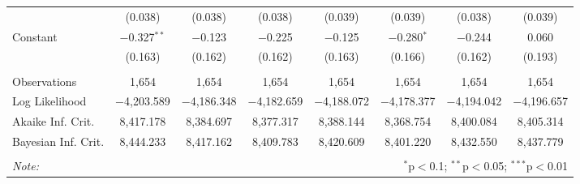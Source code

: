 \begin{sidewaystable}[!htbp]
\begin{tabular}{@{\extracolsep{5pt}}lccccccc}
  & (0.038) & (0.038) & (0.038) & (0.039) & (0.039) & (0.038) & (0.039) \\ 
  Constant & $-$0.327$^{**}$ & $-$0.123 & $-$0.225 & $-$0.125 & $-$0.280$^{*}$ & $-$0.244 & 0.060 \\ 
  & (0.163) & (0.162) & (0.162) & (0.163) & (0.166) & (0.162) & (0.193) \\ 
 \hline \\[-1.8ex] 
Observations & 1,654 & 1,654 & 1,654 & 1,654 & 1,654 & 1,654 & 1,654 \\ 
Log Likelihood & $-$4,203.589 & $-$4,186.348 & $-$4,182.659 & $-$4,188.072 & $-$4,178.377 & $-$4,194.042 & $-$4,196.657 \\ 
Akaike Inf. Crit. & 8,417.178 & 8,384.697 & 8,377.317 & 8,388.144 & 8,368.754 & 8,400.084 & 8,405.314 \\ 
Bayesian Inf. Crit. & 8,444.233 & 8,417.162 & 8,409.783 & 8,420.609 & 8,401.220 & 8,432.550 & 8,437.779 \\ 
\hline 
\hline \\[-1.8ex] 
\textit{Note:}  & \multicolumn{7}{r}{$^{*}$p$<$0.1; $^{**}$p$<$0.05; $^{***}$p$<$0.01} \\ 
\end{tabular} 
\end{sidewaystable} 
